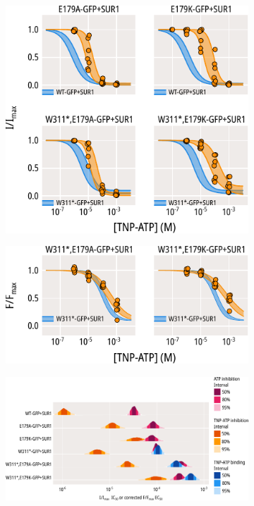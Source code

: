 \begin{figure}[h]
\begin{subfigure}[t]{0.45\textwidth}
	\end{subfigure}
	\vfill
	\begin{subfigure}[t]{0.45\textwidth}
		\caption{}\label{ch5fig:e179_tnpatp_popfits_1}
		\centering
		\includegraphics[width=\textwidth]{e179_3.pdf}
	\end{subfigure}
	\hfill
	\begin{subfigure}[t]{0.45\textwidth}
		\caption{}\label{ch5fig:e179_tnpatp_popfits_2}
		\centering
		\includegraphics[width=\textwidth]{e179_4.pdf}
	\end{subfigure}
	\vfill
	\begin{subfigure}[t]{0.9\textwidth}
		\caption{}\label{ch5fig:e179_ec50_fits}
		\centering
		\includegraphics[width=\textwidth]{e179_5.pdf}

\end{subfigure}
\end{figure}
